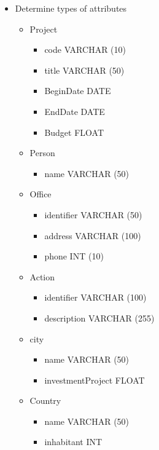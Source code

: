 \documentclass[13pt,a4paper]{report}
\begin{document}
\begin{itemize}
\item Determine types of attributes
	\begin{itemize}
	\item Project
		\begin{itemize}
		\item code VARCHAR (10)
		\item title VARCHAR (50)
		\item BeginDate DATE
		\item EndDate DATE
		\item Budget FLOAT
		\end{itemize}
	\item Person
		\begin{itemize}
		\item name VARCHAR (50)
		\end{itemize}
	\item Office
		\begin{itemize}
		\item identifier VARCHAR (50)
		\item address VARCHAR (100)
		\item phone INT (10)
		\end{itemize}
	\item Action
		\begin{itemize}
		\item identifier VARCHAR (100)
		\item description VARCHAR (255)
		\end{itemize}
	\item city
		\begin{itemize}
		\item name VARCHAR (50)
		\item investmentProject FLOAT
		\end{itemize}
	\item Country
		\begin{itemize}
		\item name VARCHAR (50)
		\item inhabitant INT
		\end{itemize}
	\end{itemize}


\end{itemize}
\end{document}
